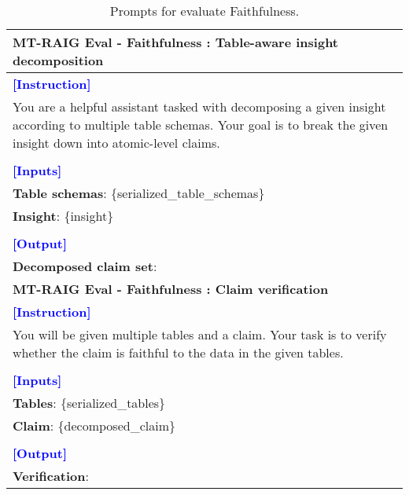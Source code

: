 \begin{table*}[htbp]
\centering
\begin{tabularx}{\textwidth}{X}
\toprule

\textbf{MT-RAIG Eval - Faithfulness : Table-aware insight decomposition} \\ \midrule
\textcolor{blue}{\textbf{[Instruction]}} \\
You are a helpful assistant tasked with decomposing a given insight according to multiple table schemas. Your goal is to break the given insight down into atomic-level claims. \\\\
\textcolor{blue}{\textbf{[Inputs]}} \\
\textbf{Table schemas}: \{serialized\_table\_schemas\} \\
\textbf{Insight}: \{insight\} \\\\
\textcolor{blue}{\textbf{[Output]}} \\
\textbf{Decomposed claim set}: \\

\midrule

\textbf{MT-RAIG Eval - Faithfulness : Claim verification} \\ \midrule
\textcolor{blue}{\textbf{[Instruction]}} \\
You will be given multiple tables and a claim. Your task is to verify whether the claim is faithful to the data in the given tables.  \\\\
\textcolor{blue}{\textbf{[Inputs]}} \\
\textbf{Tables}: \{serialized\_tables\} \\
\textbf{Claim}: \{decomposed\_claim\} \\\\
\textcolor{blue}{\textbf{[Output]}} \\
\textbf{Verification}: \\
\bottomrule
\end{tabularx}
\caption{Prompts for evaluate \eval Faithfulness.}
\label{pmt:apx_faith}
\end{table*}